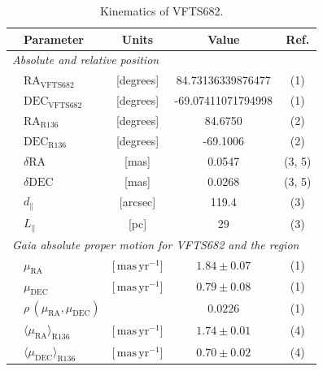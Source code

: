\documentclass[a4paper,fleqn,usenatbib]{mnras}
\newcommand{\masyr}{\,\mathrm{mas}\,\mathrm{yr}^{-1}}
\begin{document}
\begin{table}
  \begin{center}
    \caption{Kinematics of VFTS682. }
    \begin{tabular}{llc|c|c}
      \hline
      \hline
      &Parameter & Units & Value & Ref.\\
      \hline
      \multicolumn{5}{l}{\emph{Absolute and relative position}} \\
      \hline
         &$\mathrm{RA}_\mathrm{VFTS682}$&[degrees] & \phantom{-0}84.73136339876477 
                     & (1) \\        
               &$\mathrm{DEC}_\mathrm{VFTS682}$&[degrees] &
                                                            \phantom{0}-69.07411071794998
                     & (1)  \\    
                                                     
                        &$\mathrm{RA}_\mathrm{R136}$&[degrees] & \phantom{00}84.6750
                     &  (2) \\        
               &$     \mathrm{DEC}_\mathrm{R136}$&[degrees] &  \phantom{0}-69.1006
                     &  (2) \\       
        &$      \delta\mathrm{RA}$  &[mas] & \phantom{-00}0.0547                      
        &  (3, 5)
  \\        
               &$     \delta\mathrm{DEC}$  &[mas] & \phantom{-00}0.0268 
                     &  (3, 5) \\  
                       &$  d_\parallel$  & [arcsec]
                         & 119.4
                                 &  (3) \\
      &$L_\parallel$ & [pc] & 29 & (3) \\
      
                          
                     \hline
           \multicolumn{5}{l}{\emph{Gaia absolute proper motion for VFTS682
      and the region}} \\
      \hline
          &$\mu_\mathrm{RA}$&[$\masyr$] & $1.84\pm 0.07$
                     & (1) \\        
               &$\mu_\mathrm{DEC}$&[$\masyr$] & $0.79\pm 0.08$
                     &  (1) \\        
                 & $\rho\,(\mu_\mathrm{RA}, \mu_\mathrm{DEC})$ &  & $0.0226$
                        & (1)  \\         
       &$\langle\mu_\mathrm{RA}\rangle_\mathrm{R136}$&[$\masyr$] & $1.74\pm0.01$
                        & (4) \\
      &$\langle\mu_\mathrm{DEC}\rangle_\mathrm{R136}$&[$\masyr$]
                & $0.70\pm0.02$ &  (4)\\
\hline
      

\end{tabular}
\end{center}
\end{table}
\end{document}
